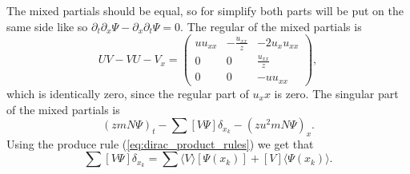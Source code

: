 \documentclass[english,master]{liumaiex}
\theoremstyle{plain}
\theoremstyle{definition}
\begin{document}
The mixed partials should be equal, so for simplify both parts will be put on the same side like so $\partial_t \partial_x \Psi - \partial_x \partial_t \Psi = 0$. The regular of the mixed partials is
\begin{equation}
	UV - VU - V_x =
	\begin{pmatrix}
		u u_{xx} & -\frac{u_{xx}}{z} & -2 u_x u_{xx} \\
		0 & 0 & \frac{u_{xx}}{z} \\
		0 & 0 & -u u_{xx}
	\end{pmatrix},
\end{equation}
which is identically zero, since the regular part of $u_xx$ is zero. The singular part of the mixed partials is
\begin{equation}
	(zmN \Psi)_t - \sum [V \Psi] \delta_{x_k} - (zu^2mN \Psi)_x.
\end{equation}
Using the produce rule (\ref{eq:dirac_product_rules}) we get that
\begin{equation}
	\sum [V \Psi] \delta_{x_k} = \sum \langle V \rangle [\Psi(x_k)] + [V]\langle \Psi(x_k) \rangle.
\end{equation}


%
%
\newpage


\end{document}
